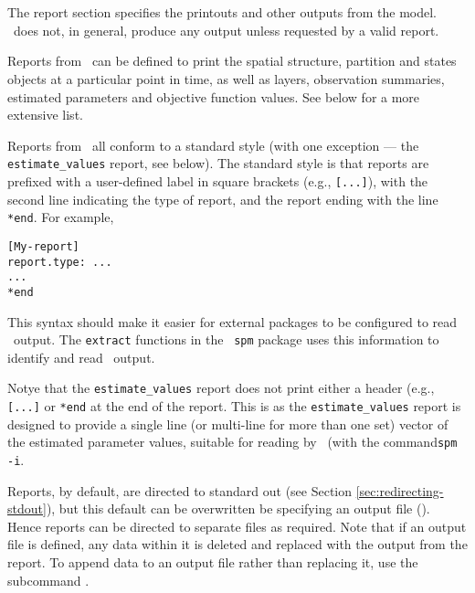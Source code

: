 \section{\label{sec:report-section}}

The report section specifies the printouts and other outputs from the model. \SPM\ does not, in general, produce any output unless requested by a valid report. 

Reports from \SPM\ can be defined to print the spatial structure, partition and states objects at a particular point in time, as well as layers, observation summaries, estimated parameters and objective function values. See below for a more extensive list.

Reports from \SPM\ all conform to a standard style (with one exception --- the \texttt{estimate\_values} report, see below). The standard style is that reports are prefixed with a user-defined label in square brackets (e.g., \texttt{[...]}), with the second line indicating the type of report, and the report ending with the line \texttt{*end}. For example,

\begin{verbatim} 
[My-report]
report.type: ...
...
*end
\end{verbatim}

This syntax should make it easier for external packages to be configured to read \SPM\ output. The \texttt{extract} functions in the \R\ \texttt{spm} package uses this information to identify and read \SPM\ output.

Notye that the \texttt{estimate\_values} report does not print either a header (e.g., \texttt{[...]} or \texttt{*end} at the end of the report. This is as the \texttt{estimate\_values} report is designed to provide a single line (or multi-line for more than one set) vector of the estimated parameter values, suitable for reading by \SPM\ (with the command\texttt{spm -i}. 

Reports, by default, are directed to standard out (see Section \ref{sec:redirecting-stdout}), but this default can be overwritten be specifying an output file (). Hence reports can be directed to separate files as required. Note that if an output file is defined, any data within it is deleted and replaced with the output from the report. To append data to an output file rather than replacing it, use the subcommand .

